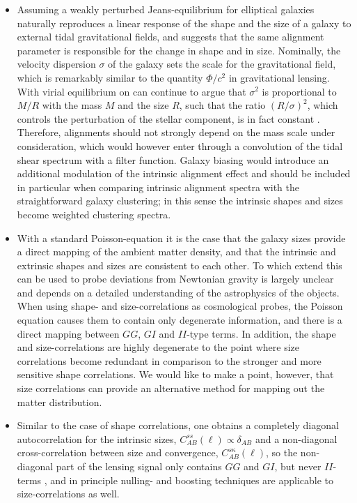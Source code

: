 \documentclass[a4paper,fleqn,usenatbib]{mnras}
\begin{document}
\begin{itemize}
\item{Assuming a weakly perturbed Jeans-equilibrium for elliptical galaxies naturally reproduces a linear response of the shape and the size of a galaxy to external tidal gravitational fields, and suggests that the same alignment parameter is responsible for the change in shape and in size. Nominally, the velocity dispersion $\sigma$ of the galaxy sets the scale for the gravitational field, which is remarkably similar to the quantity $\Phi/c^2$ in gravitational lensing. With virial equilibrium on can continue to argue that $\sigma^2$ is proportional to $M/R$ with the mass $M$ and the size $R$, such that the ratio $(R/\sigma)^2$, which controls the perturbation of the stellar component, is in fact constant \citep[compare][]{piras_mass_2018}. Therefore, alignments should not strongly depend on the mass scale under consideration, which would however enter through a convolution of the tidal shear spectrum with a filter function. Galaxy biasing would introduce an additional modulation of the intrinsic alignment effect and should be included in particular when comparing intrinsic alignment spectra with the straightforward galaxy clustering; in this sense the intrinsic shapes and sizes become weighted clustering spectra.}

\item{With a standard Poisson-equation it is the case that the galaxy sizes provide a direct mapping of the ambient matter density, and that the intrinsic and extrinsic shapes and sizes are consistent to each other. To which extend this can be used to probe deviations from Newtonian gravity is largely unclear and depends on a detailed understanding of the astrophysics of the objects. When using shape- and size-correlations as cosmological probes, the Poisson equation causes them to contain only degenerate information, and there is a direct mapping between $GG$, $GI$ and $II$-type terms. In addition, the shape and size-correlations are highly degenerate to the point where size correlations become redundant in comparison to the stronger and more sensitive shape correlations. We would like to make a point, however, that size correlations can provide an alternative method for mapping out the matter distribution.}

\item{Similar to the case of shape correlations, one obtains a completely diagonal autocorrelation for the intrinsic sizes, $C^{ss}_{AB}(\ell)\propto\delta_{AB}$ and a non-diagonal cross-correlation between size and convergence, $C^{s\kappa}_{AB}(\ell)$, so the non-diagonal part of the lensing signal only contains $GG$ and $GI$, but never $II$-terms \citep{jain_cross-correlation_2003, takada_tomography_2004, huterer_nulling_2005}, and in principle nulling- and boosting techniques \citep{joachimi_removal_2009, joachimi_controlling_2010, joachimi_intrinsic_2010} are applicable to size-correlations as well.}


\end{itemize}
\end{document}
